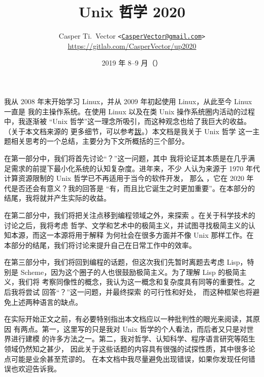 \documentclass[UTF8]{ctexart}
\begin{document}
\title{\textbf{Unix 哲学 2020}}
\author{%
	Casper Ti.\ Vector
	\texttt{<\url{CasperVector@gmail.com}>}\\
	\url{https://gitlab.com/CasperVector/up2020}%
}
\date{2019 年 8--9 月（\docversion）}
\maketitle
\vspace{\baselineskip}
\tableofcontents


我从 2008 年末开始学习 Linux，并从 2009 年初起使用 Linux，从此至今 Linux 一直是
我的主操作系统。在使用 Linux 以及在类 Unix 操作系统圈内活动的过程中，我逐渐被
“Unix 哲学”这一理念所吸引，而这种观念也给了我巨大的收益。（关于本文档来源的
更多细节，可以参考\hyperref[sec:afterword]{跋}。）本文档是我关于 Unix 哲学
这一主题相关思考的一个总结，主要分为下文所概括的三个部分。

在第一部分中，我们将首先讨论“？”这一问题，其中
我将论证其本质是在几乎满足需求的前提下最小化系统的认知复杂度。进年来，不少
人认为来源于 1970 年代计算资源限制的 Unix 哲学已不再适用于当今的软件开发，
那么 ，它在 2020 年代是否还会有意义？我的回答是
“有，而且比它诞生之时更加重要”。在本部分的结尾，我将就并产生实际的收益。

在第二部分中，我们将把关注点移到编程领域之外，来探索 。在关于科学技术的讨论之后，我将考虑
哲学、文学和艺术中的极简主义，并试图寻找极简主义的认知本源，而这一本源将用于解释
为何社会在很多方面并不像 Unix 那样工作。在本部分的结尾，我们将讨论来提升自己在日常工作中的效率。

在第三部分中，我们将回到编程的话题，但这次我们先暂时离题去考虑 Lisp，特别是
Scheme，因为这个圈子的人也很鼓励极简主义。为了理解 Lisp 的极简主义，我们将
考察同像性的概念，我认为这一概念和复杂度具有同等的重要性。之后我将尝试
回答“？”这一问题，并最终探索%
的可行性和好处，
而这种框架也将避免上述两种语言的缺点。

在实际开始正文之前，有必要特别指出本文档应以一种批判性的眼光来阅读，其原因
有两点。第一，这里写的只是我对 Unix 哲学的个人看法，而后者又只是对世界进行建模
的许多方法之一。第二，我对哲学、认知科学、程序语言研究等陌生领域仍然知之甚少，
因此关于这些话题的内容具有很强的试探性质，其中很多论点可能是业余甚至荒谬的。
在本文档中我尽量避免出现错误，如果你发现任何错误也欢迎告诉我。
\end{document}
